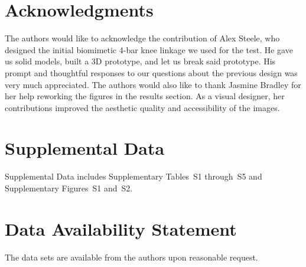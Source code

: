 \documentclass[utf8]{FrontiersinHarvard} %
\begin{document}

\section*{Acknowledgments}
The authors would like to acknowledge the contribution of Alex Steele, who designed the initial biomimetic 4-bar knee linkage we used for the test. He gave us solid models, built a 3D prototype, and let us break said prototype. His prompt and thoughtful responses to our questions about the previous design was very much appreciated. The authors would also like to thank Jasmine Bradley for her help reworking the figures in the results section. As a visual designer, her contributions improved the aesthetic quality and accessibility of the images. 

\section*{Supplemental Data}
Supplemental Data includes Supplementary Tables~S1 through~S5 and Supplementary Figures~S1 and~S2.
 

\section*{Data Availability Statement}
The data sets are available from the authors upon reasonable request.




\end{document}
